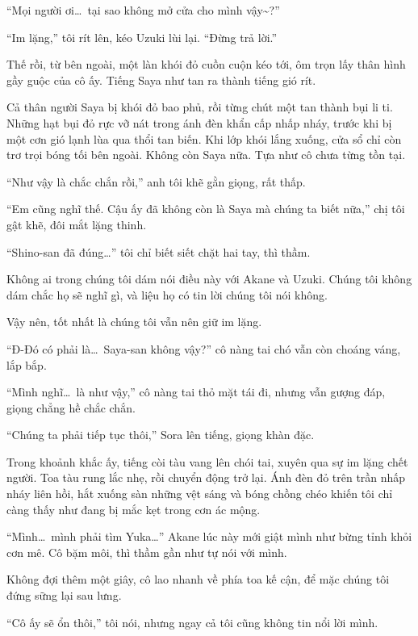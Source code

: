 \documentclass[../main.tex]{subfiles}
\begin{document}
``Mọi người ơi\dots\ tại sao không mở cửa cho mình vậy\~{}?''

``Im lặng,'' tôi rít lên, kéo Uzuki lùi lại. ``Đừng trả lời.''

Thế rồi, từ bên ngoài, một làn khói đỏ cuồn cuộn kéo tới, ôm trọn lấy thân hình gầy guộc của cô ấy. Tiếng Saya như tan ra thành tiếng gió rít.

Cả thân người Saya bị khói đỏ bao phủ, rồi từng chút một tan thành bụi li ti. Những hạt bụi đỏ rực vỡ nát trong ánh đèn khẩn cấp nhấp nháy, trước khi bị một cơn gió lạnh lùa qua thổi tan biến. Khi lớp khói lắng xuống, cửa sổ chỉ còn trơ trọi bóng tối bên ngoài. Không còn Saya nữa. Tựa như cô chưa từng tồn tại.


``Như vậy là chắc chắn rồi,'' anh tôi khẽ gằn giọng, rất thấp.

``Em cũng nghĩ thế. Cậu ấy đã không còn là Saya mà chúng ta biết nữa,'' chị tôi gật khẽ, đôi mắt lặng thinh.

``Shino-san đã đúng\dots'' tôi chỉ biết siết chặt hai tay, thì thầm.

Không ai trong chúng tôi dám nói điều này với Akane và Uzuki. Chúng tôi không dám chắc họ sẽ nghĩ gì, và liệu họ có tin lời chúng tôi nói không.

Vậy nên, tốt nhất là chúng tôi vẫn nên giữ im lặng.

``Đ-Đó có phải là\dots\ Saya-san không vậy?'' cô nàng tai chó vẫn còn choáng váng, lắp bắp.

``Mình nghĩ\dots\ là như vậy,'' cô nàng tai thỏ mặt tái đi, nhưng vẫn gượng đáp, giọng chẳng hề chắc chắn.

``Chúng ta phải tiếp tục thôi,'' Sora lên tiếng, giọng khàn đặc.

Trong khoảnh khắc ấy, tiếng còi tàu vang lên chói tai, xuyên qua sự im lặng chết người. Toa tàu rung lắc nhẹ, rồi chuyển động trở lại. Ánh đèn đỏ trên trần nhấp nháy liên hồi, hắt xuống sàn những vệt sáng và bóng chồng chéo khiến tôi chỉ càng thấy như đang bị mắc kẹt trong cơn ác mộng.

``Mình\dots\ mình phải tìm Yuka\dots'' Akane lúc này mới giật mình như bừng tỉnh khỏi cơn mê. Cô bặm môi, thì thầm gần như tự nói với mình.

Không đợi thêm một giây, cô lao nhanh về phía toa kế cận, để mặc chúng tôi đứng sững lại sau lưng.

``Cô ấy sẽ ổn thôi,'' tôi nói, nhưng ngay cả tôi cũng không tin nổi lời mình.
\end{document}
